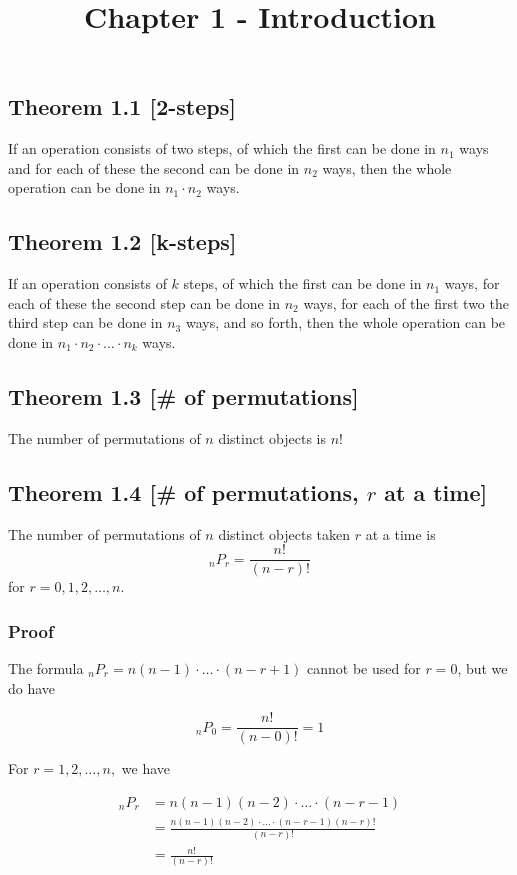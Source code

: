 \documentclass{article}
\title{Chapter 1 - Introduction}
\begin{document}
\maketitle



\subsection*{Theorem 1.1 [2-steps]}
If an operation consists of two steps, of which the first can be done in \(n_1\) ways and for each of these the second can be done in \(n_2\) ways, then the whole operation can be done in \(n_1 \cdot n_2\) ways.

\subsection*{Theorem 1.2 [k-steps]}
If an operation consists of \(k\) steps, of which the first can be done in \(n_1\) ways, for each of these the second step can be done in \(n_2\) ways, for each of the first two the third step can be done in \(n_3\) ways, and so forth, then the whole operation can be done in \(n_1 \cdot n_2 \cdot \ldots \cdot n_k\) ways.

\subsection*{Theorem 1.3 [\# of permutations]} The number of permutations of \(n\) distinct objects is \(n!\)

\subsection*{Theorem 1.4 [\# of permutations, \(r\) at a time]} The number of permutations of \(n\) distinct objects taken \(r\) at a time is
\[{}_nP_r = \frac{n!}{(n-r)!}\]
for \(r=0,1,2,\ldots,n\).

\subsubsection*{Proof} The formula \({}_nP_r=n(n-1) \cdot \ldots \cdot (n-r+1)\) cannot be used for \(r=0\), but we do have

\[{}_nP_0 = \frac{n!}{(n-0)!}=1\]

For \(r=1,2,\ldots,n,\) we have


\begin{align*}
{}_nP_r&=n(n-1)(n-2) \cdot \ldots \cdot (n-r-1)\\
&=\frac{n(n-1)(n-2) \cdot \ldots \cdot (n-r-1)(n-r)!}{(n-r)!}\\
&=\frac{n!}{(n-r)!}
\end{align*}
\end{document}
